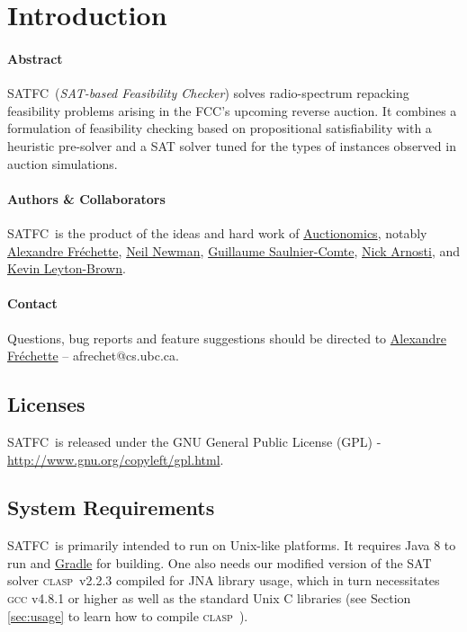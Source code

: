 \documentclass[
10pt, %
letterpaper, %
oneside, %
headinclude,footinclude, %
BCOR5mm, %
needspace, %
]{scrartcl}
\newcommand{\SATFC}{\textsc{SATFC}~}
\newcommand{\clasp}{\textsc{clasp}~}
\begin{document}
\section{Introduction}

\paragraph{Abstract} \SATFC (\emph{SAT-based Feasibility Checker}) solves radio-spectrum repacking feasibility problems arising in the FCC's upcoming reverse auction. It combines a formulation of feasibility checking based on propositional satisfiability with a heuristic pre-solver and a SAT solver tuned for the types of instances observed in auction simulations.

\paragraph{Authors \& Collaborators}  \SATFC is the product of the ideas and hard work of \href{http://www.auctionomics.com/}{Auctionomics}, notably \href{http://www.cs.ubc.ca/~afrechet/}{Alexandre Fr\'echette}, \href{http://www.cs.ubc.ca/~newmanne/}{Neil Newman}, \href{http://www.cs.mcgill.ca/~gsauln/}{Guillaume Saulnier-Comte}, \href{http://web.stanford.edu/~narnosti/}{Nick Arnosti}, and \href{http://www.cs.ubc.ca/~kevinlb/}{Kevin Leyton-Brown}.

\paragraph{Contact} Questions, bug reports and feature suggestions should be directed to \href{mailto:afrechet@cs.ubc.ca}{Alexandre Fr\'echette} -- afrechet@cs.ubc.ca.

\subsection{Licenses}

\SATFC is released under the GNU General Public License (GPL) - \url{http://www.gnu.org/copyleft/gpl.html}.

\subsection{System Requirements}

\SATFC is primarily intended to run on Unix-like platforms. It requires Java 8 to run and \href{http://www.gradle.org/}{Gradle} for building. One also needs our modified version of the SAT solver \clasp v2.2.3 compiled for JNA library usage, which in turn necessitates \textsc{gcc} v4.8.1 or higher as well as the standard Unix C libraries (see Section \ref{sec:usage} to learn how to compile \clasp).
\end{document}
